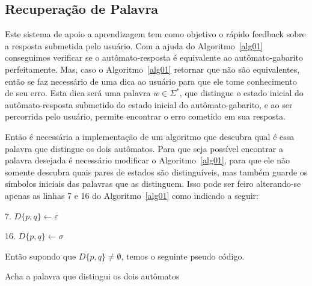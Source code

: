 \documentclass[
	12pt,				%
	openany,
	oneside,
	a4paper,			%
	english,			%
	brazil				%
	]{abntex2}
\begin{document}
\subsection {Recuperação de Palavra}

  Este sistema de apoio a aprendizagem tem como objetivo o rápido feedback sobre a resposta submetida pelo usuário. Com a ajuda do Algoritmo~\ref{alg01} conseguimos verificar se o autômato-resposta é equivalente ao autômato-gabarito perfeitamente. Mas, caso o Algoritmo~\ref{alg01} retornar que não são equivalentes, então se faz necessário de uma dica ao usuário para que ele tome conhecimento de seu erro. Esta dica será uma palavra $w \in \Sigma^*$, que distingue o estado inicial do autômato-resposta submetido do estado inicial do autômato-gabarito, e ao ser percorrida pelo usuário, permite encontrar o erro cometido em sua resposta.

  Então é necessária a implementação de um algoritmo que descubra qual é essa palavra que distingue os dois autômatos. Para que seja possível encontrar a palavra desejada é necessário modificar o Algoritmo~\ref{alg01}, para que ele não somente descubra quais pares de estados são distinguíveis, mas também guarde os símbolos iniciais das palavras que as distinguem. Isso pode ser feiro alterando-se apenas as linhas 7 e 16 do Algoritmo~\ref{alg01} como indicado a seguir:

  \begin{alineas}%
    \item[7.]  $ D\{p,q\} \gets \varepsilon $
    \item[16.] $ D\{p,q\} \gets \sigma $
  \end{alineas}


  Então supondo que $D\{p,q\} \neq \emptyset$, temos o seguinte  pseudo código.

  \begin{algorithm}[H]
    \caption{Acha a palavra que distingui os dois autômatos}
    \label{alg02}
  \end{algorithm}
\end{document}
